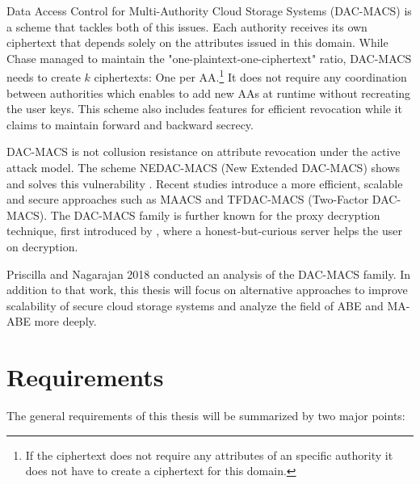 \documentclass[twocolumn]{article}
\begin{document}

Data Access Control for Multi-Authority Cloud Storage Systems (DAC-MACS) \cite{yang2013dac} is a scheme that tackles both of this issues. Each authority receives its own ciphertext that depends solely on the attributes issued in this domain. While Chase managed to maintain the "one-plaintext-one-ciphertext" ratio, DAC-MACS needs to create $k$ ciphertexts: One per AA.\footnote{If the ciphertext does not require any attributes of an specific authority it does not have to create a ciphertext for this domain.} It does not require any coordination between authorities which enables to add new AAs at runtime without recreating the user keys. This scheme also includes features for efficient revocation while it claims to maintain forward and backward secrecy. 

DAC-MACS is not collusion resistance on attribute revocation under the active attack model. The scheme NEDAC-MACS (New Extended DAC-MACS) shows and solves this vulnerability \cite{wu2017security}. Recent studies introduce a more efficient, scalable and secure approaches such as MAACS \cite{li2016secure} and TFDAC-MACS (Two-Factor DAC-MACS)\cite{li2017two}. The DAC-MACS family is further known for the proxy decryption technique, first introduced by \cite{li2013matrix}, where a honest-but-curious server helps the user on decryption.

Priscilla and Nagarajan 2018 \cite{nagarajan2018overview} conducted an analysis of the DAC-MACS family. In addition to that work, this thesis will focus on alternative approaches to improve scalability of secure cloud storage systems and analyze the field of ABE and MA-ABE more deeply.


\section{Requirements}
\label{sec:requirements}
The general requirements of this thesis will be summarized by two major points: 
\end{document}
